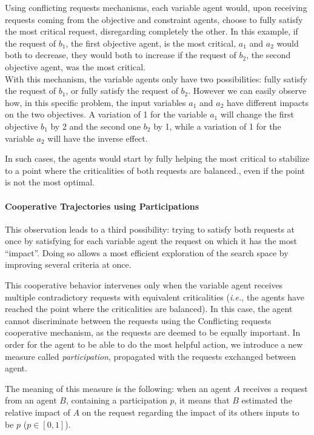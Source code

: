 Using conflicting requests mechanisms, each variable agent would, upon receiving requests coming from the objective and constraint agents, choose to fully satisfy the most critical request, disregarding completely the other. In this example, if the request of $b_1$, the first objective agent, is the most critical, $a_1$ and $a_2$ would both to decrease, they would both to increase if the request of $b_2$, the second objective agent, was the most critical.\\
With this mechanism, the variable agents only have two possibilities: fully satisfy the request of $b_1$, or fully satisfy the request of $b_2$. However we can easily observe how, in this specific problem, the input variables $a_1$ and $a_2$ have different impacts on the two objectives. A variation of 1 for the variable $a_1$ will change the first objective $b_1$ by 2 and the second one $b_2$ by 1, while a variation of 1 for the variable $a_2$ will have the inverse effect.

In such cases, the agents would start by fully helping the most critical to stabilize to a point where the criticalities of both requests are balanced., even if the point is not the most optimal.

\paragraph*{Cooperative Trajectories using Participations}
This observation leads to a third possibility: trying to satisfy both requests at once by satisfying for each variable agent the request on which it has the most \enquote{impact}. Doing so allows a most efficient exploration of the search space by improving several criteria at once.

This cooperative behavior intervenes only when the variable agent receives multiple contradictory requests with equivalent criticalities (\emph{i.e.}, the agents have reached the point where the criticalities are balanced). In this case, the agent cannot discriminate between the requests using the Conflicting requests cooperative mechanism, as the requests are deemed to be equally important. In order for the agent to be able to do the most helpful action, we introduce a new measure called \emph{participation}, propagated with the requests exchanged between agent.

The meaning of this measure is the following: when an agent $A$ receives a request from an agent $B$, containing a participation $p$, it means that $B$ estimated the relative impact of $A$ on the request regarding the impact of its others inputs to be $p$ ($p \in [0,1]$).

